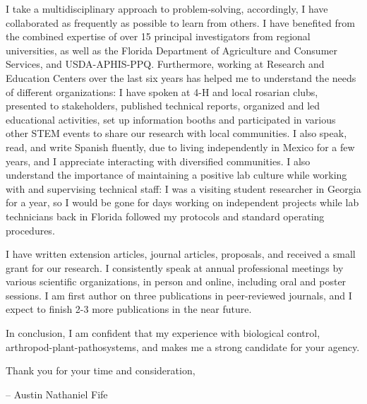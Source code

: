 \documentclass[11pt]{letter} %
\begin{document}
\begin{letter}
		I take a multidisciplinary approach to problem-solving, accordingly, I have collaborated as frequently as possible to learn from others. I have benefited from the combined expertise of over 15 principal investigators from regional universities, as well as the Florida Department of Agriculture and Consumer Services, and USDA-APHIS-PPQ. Furthermore, working at Research and Education Centers over the last six years has helped me to understand the needs of different organizations: I have spoken at 4-H and local rosarian clubs, presented to stakeholders, published technical reports, organized and led educational activities, set up information booths and participated in various other STEM events to share our research with local communities. I also speak, read, and write Spanish fluently, due to living independently in Mexico for a few years, and I appreciate interacting with diversified communities. I also understand the importance of maintaining a positive lab culture while working with and supervising technical staff: I was a visiting student researcher in Georgia for a year, so I would be gone for days working on independent projects while lab technicians back in Florida followed my protocols and standard operating procedures.
		
		I have written extension articles, journal articles, proposals, and received a small grant for our research. I consistently speak at annual professional meetings by various scientific organizations, in person and online, including oral and poster sessions. I am first author on three publications in peer-reviewed journals, and I expect to finish 2-3 more publications in the near future.
		
		In conclusion, I am confident that my experience with biological control, arthropod-plant-pathosystems, and  makes me a strong candidate for your agency.
		
		Thank you for your time and consideration,
		
		\quad -- Austin Nathaniel Fife
		
		\thispagestyle{empty}
		
	\end{letter}
	
\end{document}
